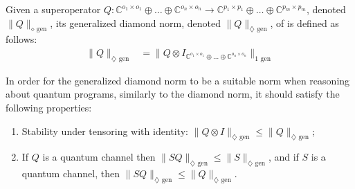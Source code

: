 \begin{definition} \label{def:gen_diamond_norm}
Given a superoperator $Q: \mathbb{C}^{o_1 \times o_1} \oplus \ldots \oplus \mathbb{C}^{o_n \times o_n}  \rightarrow \mathbb{C}^{p_1 \times p_1} \oplus \ldots \oplus  \mathbb{C}^{p_m \times p_m} $, denoted $\|Q\|_{\diamond \text{ gen}}$, its generalized diamond norm, denoted $\|Q\|_{\diamondsuit \text{ gen}}$, of is defined as follows:
\begin{equation*}
  \begin{split}
    \lVert Q  \rVert_{\diamondsuit \text{ gen}} & =  \lVert Q \otimes I_{ \mathbb{C}^{o_1 \times o_1} \oplus \ldots \oplus \mathbb{C}^{o_n \times o_n}}  \rVert_{1 \text{ gen}}
  \end{split}
\end{equation*}
\end{definition} 

In order for the generalized diamond norm to be a suitable norm when reasoning about quantum programs, similarly to the diamond norm, it should satisfy the following properties:
\begin{enumerate}
  \item Stability under tensoring with identity: $\|Q \otimes I\|_{\diamondsuit \text{ gen}} \leq \|Q\|_{\diamondsuit \text{ gen}}$;
  \item If $Q$ is a quantum channel then $\lVert S  Q \rVert_{\diamondsuit \text{ gen}} \leq \lVert S \rVert_{\diamondsuit \text{ gen}}$, and if $S$ is a quantum channel, then $\lVert S  Q \rVert_{\diamondsuit \text{ gen}} \leq \lVert Q \rVert_{\diamondsuit \text{ gen}}$.
\end{enumerate}

